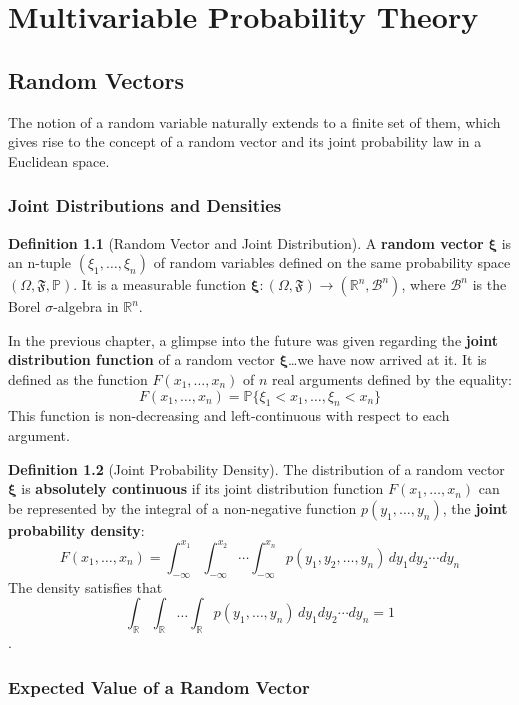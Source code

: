 \documentclass[12pt, openany]{book}
\theoremstyle{definition}
\newtheorem{definition}{Definition}[section]
\theoremstyle{plain}
\theoremstyle{remark}
\newcommand{\R}{\mathbb{R}}
\newcommand{\B}{\mathcal{B}}
\newcommand{\probP}{\mathbb{P}}
\newcommand{\germF}{\mathfrak{F}} %
\begin{document}
\chapter{Multivariable Probability Theory}

\section{Random Vectors}
The notion of a random variable naturally extends to a finite set of them, which gives rise to the concept of a random vector and its joint probability law in a Euclidean space.

\subsection{Joint Distributions and Densities}

\begin{definition}[Random Vector and Joint Distribution]
A \textbf{random vector} $\boldsymbol{\xi}$ is an n-tuple $(\xi_1, \dots, \xi_n)$ of random variables defined on the same probability space $(\Omega, \germF, \probP)$. It is a measurable function $\boldsymbol{\xi}: (\Omega, \germF) \to (\R^n, \B^n)$, where $\B^n$ is the Borel $\sigma$-algebra in $\R^n$.

In the previous chapter, a glimpse into the future was given regarding the \textbf{joint distribution function} of a random vector $\boldsymbol{\xi}$\dots we have now arrived at it. It is defined as the function $F(x_1, \dots, x_n)$ of $n$ real arguments defined by the equality:
$$ F(x_1, \dots, x_n) = \probP\{\xi_1 < x_1, \dots, \xi_n < x_n \} $$
This function is non-decreasing and left-continuous with respect to each argument.
\end{definition}

\begin{definition}[Joint Probability Density]
The distribution of a random vector $\boldsymbol{\xi}$ is \textbf{absolutely continuous} if its joint distribution function $F(x_1, \dots, x_n)$ can be represented by the integral of a non-negative function $p(y_1, \dots, y_n)$, the \textbf{joint probability density}:
$$ F(x_1, \dots, x_n) = \int_{-\infty}^{x_1} \int_{-\infty}^{x_2} \cdots \int_{-\infty}^{x_n} p(y_1, y_2, \dots, y_n) \,dy_1 dy_2 \cdots dy_n $$
The density satisfies that $$\int_{\R}\int_{\R} \dots\int_{\R} p(y_1, \dots, y_n) \,dy_1 dy_2\cdots dy_n = 1$$.
\end{definition}

\subsection{Expected Value of a Random Vector}
\end{document}
